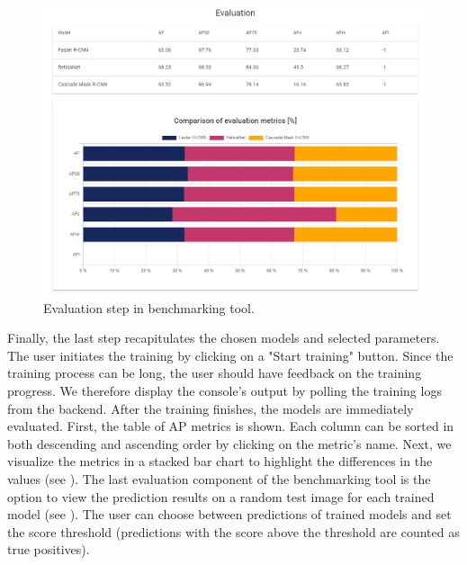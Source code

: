 \begin{figure}[ht]
    \centering
    \includegraphics[width=1.1\linewidth]{Sources/Figures/eval_table_plot.png}
    \caption{Evaluation step in benchmarking tool.}
    \label{fig:evaluation-step}
\end{figure}

Finally, the last step recapitulates the chosen models and selected parameters.
The user initiates the training by clicking on a "Start training" button. Since
the training process can be long, the user should have feedback on the training
progress. We therefore display the console's output by polling the training logs
from the backend. After the training finishes, the models are immediately
evaluated. First, the table of AP metrics is shown. Each column can be sorted in
both descending and ascending order by clicking on the metric's name. Next, we
visualize the metrics in a stacked bar chart to highlight the differences in the
values (see ). The last evaluation component of
the benchmarking tool is the option to view the prediction results on a random
test image for each trained model (see ). The
user can choose between predictions of trained models and set the score
threshold (predictions with the score above the threshold are counted as
true positives).

